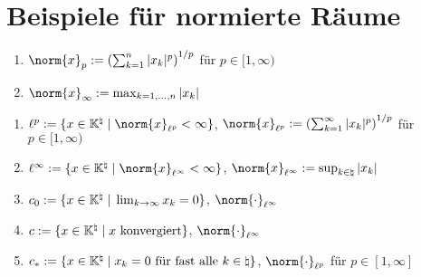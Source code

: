 \section{%
    Beispiele für normierte Räume%
}

\begin{Bsp}
    \begin{enumerate}[label=\emph{(\alph*)}]
        \item
        $\norm{x}_p := \left(\sum_{k=1}^n |x_k|^p\right)^{1/p}$ für $p \in [1, \infty)$

        \item
        $\norm{x}_\infty := \max_{k=1,\dotsc,n} |x_k|$
    \end{enumerate}
\end{Bsp}

\begin{Bsp}
    \begin{enumerate}[label=\emph{(\alph*)}]
        \item
        $\ell^p := \{x \in \KK^\natural \;|\;
        \norm{x}_{\ell^p} < \infty\}$, $\norm{x}_{\ell^p} :=
        \left(\sum_{k=1}^\infty |x_k|^p\right)^{1/p}$ für $p \in [1, \infty)$

        \item
        $\ell^\infty := \{x \in \KK^\natural \;|\;
        \norm{x}_{\ell^\infty} < \infty\}$, $\norm{x}_{\ell^\infty} :=
        \sup_{k \in \natural} |x_k|$

        \item
        $c_0 := \{x \in \mathbb{K}^\natural \;|\; \lim_{k \to \infty} x_k = 0\}$,
        $\norm{\cdot}_{\ell^\infty}$

        \item
        $c := \{x \in \mathbb{K}^\natural \;|\; x \text{ konvergiert}\}$,
        $\norm{\cdot}_{\ell^\infty}$

        \item
        $c_\ast := \{x \in \mathbb{K}^\natural \;|\; x_k = 0 \text{ für fast alle }
        k \in \natural\}$, $\norm{\cdot}_{\ell^p}$ für $p \in [1, \infty]$
    \end{enumerate}
\end{Bsp}

\linie
\pagebreak

